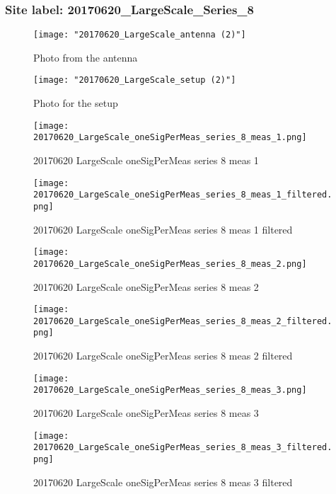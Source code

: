 \subsubsection{Site label: 20170620\_LargeScale\_Series\_8}
\begin{figure}[ht] \caption{Photo from the antenna}
\texttt{[image: "20170620\_LargeScale\_antenna (2)"]}\centering\end{figure}
\begin{figure}[ht] \caption{Photo for the setup}
\texttt{[image: "20170620\_LargeScale\_setup (2)"]}\centering\end{figure}
\begin{figure}[ht] \caption{20170620 LargeScale oneSigPerMeas series 8 meas 1}
\texttt{[image: 20170620\_LargeScale\_oneSigPerMeas\_series\_8\_meas\_1.png]}\centering\end{figure}
\begin{figure}[ht] \caption{20170620 LargeScale oneSigPerMeas series 8 meas 1 filtered}
\texttt{[image: 20170620\_LargeScale\_oneSigPerMeas\_series\_8\_meas\_1\_filtered.png]}\centering\end{figure}
\begin{figure}[ht] \caption{20170620 LargeScale oneSigPerMeas series 8 meas 2}
\texttt{[image: 20170620\_LargeScale\_oneSigPerMeas\_series\_8\_meas\_2.png]}\centering\end{figure}
\begin{figure}[ht] \caption{20170620 LargeScale oneSigPerMeas series 8 meas 2 filtered}
\texttt{[image: 20170620\_LargeScale\_oneSigPerMeas\_series\_8\_meas\_2\_filtered.png]}\centering\end{figure}
\begin{figure}[ht] \caption{20170620 LargeScale oneSigPerMeas series 8 meas 3}
\texttt{[image: 20170620\_LargeScale\_oneSigPerMeas\_series\_8\_meas\_3.png]}\centering\end{figure}
\begin{figure}[ht] \caption{20170620 LargeScale oneSigPerMeas series 8 meas 3 filtered}
\texttt{[image: 20170620\_LargeScale\_oneSigPerMeas\_series\_8\_meas\_3\_filtered.png]}\centering\end{figure}
\clearpage
